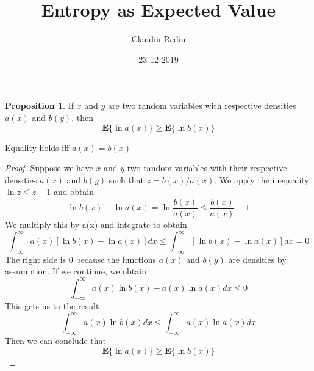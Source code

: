 \documentclass[11pt, a4paper]{article}
\title{{Entropy as Expected Value}}
\date{23-12-2019}
\author{Claudiu Rediu}
\theoremstyle{definition}
\theoremstyle{theorem}
\newtheorem*{theorem}{Proposition}
\begin{document}
	\maketitle
	\newpage
	\newpage
	\begin{theorem}
		If $x$ and $y$ are two random variables with respective densities $a(x)$ and $b(y)$, then
		$$ \mathbf{E}\{\ln{a(x)}\} \geq \mathbf{E}\{\ln{b(x)}\}$$
		
		Equality holds iff $a(x) = b(x)$
	\end{theorem}

	\begin{proof}
	

		Suppose we have $x$ and $y$ two random variables with their respective densities $a(x)$ and $b(y)$ such that $z=b(x)/a(x)$. We apply the inequality $\ln{z} \leq z - 1$ and obtain $$ \ln{b(x)} - \ln{a(x)} = \ln{\frac{b(x)}{a(x)}} \leq \frac{b(x)}{a(x)} - 1$$
		We multiply this by a(x) and integrate to obtain $$\int_{-\infty}^{\infty} a(x)[\ln{b(x)} - \ln{a(x)}]dx \leq \int_{-\infty}^{\infty}[\ln{b(x)} - \ln{a(x)}]dx = 0$$
		The right side is 0 because the functions $a(x)$ and $b(y)$ are densities by assumption. If we continue, we obtain $$\int_{-\infty}^{\infty}a(x)\ln{b(x)} - a(x)\ln{a(x)} dx\leq 0$$
		This gets us to the result $$\int_{-\infty}^{\infty}a(x)\ln{b(x)}dx \leq \int_{-\infty}^{\infty}a(x)\ln{a(x)}dx$$
		Then we can conclude that $$ \mathbf{E}\{\ln{a(x)}\} \geq \mathbf{E}\{\ln{b(x)}\}$$
	\end{proof}
\end{document}

